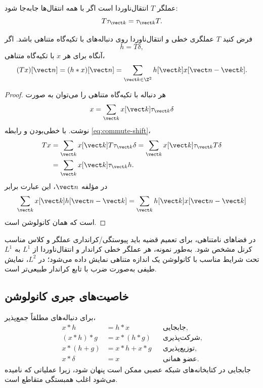 \begin{definition}
عملگر \(T\) انتقال‌ناوردا است اگر با همه انتقال‌ها جابه‌جا شود:
\begin{equation}
T\tau_{\vect k}=\tau_{\vect k}T.
\label{eq:commute-shift}
\end{equation}
\end{definition}

\begin{theorem}
فرض کنید \(T\) عملگری خطی و انتقال‌ناوردا روی دنباله‌های با تکیه‌گاه متناهی باشد. اگر
\begin{equation}
h=T\delta,
\end{equation}
آنگاه برای هر \(x\) با تکیه‌گاه متناهی،
\begin{equation}
(Tx)[\vect n]=(h*x)[\vect n]
=\sum_{\vect k\in\Z^2}h[\vect k]x[\vect n-\vect k].
\label{eq:lti-convolution}
\end{equation}
\end{theorem}

\begin{proof}
هر دنباله با تکیه‌گاه متناهی را می‌توان به صورت
\begin{equation}
x=\sum_{\vect k}x[\vect k]\tau_{\vect k}\delta
\end{equation}
نوشت. با خطی‌بودن و رابطه \eqref{eq:commute-shift}،
\begin{align}
Tx
&=\sum_{\vect k}x[\vect k]T\tau_{\vect k}\delta
=\sum_{\vect k}x[\vect k]\tau_{\vect k}T\delta\\
&=\sum_{\vect k}x[\vect k]\tau_{\vect k}h.
\end{align}
در مؤلفه \(\vect n\)، این عبارت برابر
\begin{equation}
\sum_{\vect k}x[\vect k]h[\vect n-\vect k]
=\sum_{\vect k}h[\vect k]x[\vect n-\vect k]
\end{equation}
است که همان کانولوشن است.
\end{proof}

\begin{remark}
در فضاهای نامتناهی، برای تعمیم قضیه باید پیوستگی/کرانداری عملگر و کلاس مناسب کرنل مشخص شود.
به‌طور نمونه، هر عملگر خطی کراندار و انتقال‌ناوردا از \(L^1\) به \(L^1\) تحت شرایط مناسب با کانولوشن
یک اندازه متناهی نمایش داده می‌شود؛ در \(L^2\)، نمایش طیفی به‌صورت ضرب با تابع کراندار طبیعی‌تر است.
\end{remark}

\subsection{خاصیت‌های جبری کانولوشن}
برای دنباله‌های مطلقاً جمع‌پذیر،
\begin{align}
x*h&=h*x &&\text{جابجایی},\\
(x*h)*g&=x*(h*g) &&\text{شرکت‌پذیری},\\
x*(h+g)&=x*h+x*g &&\text{توزیع‌پذیری},\\
x*\delta&=x &&\text{عضو همانی}.
\end{align}
جابجایی در کتابخانه‌های شبکه عصبی ممکن است پنهان شود، زیرا عملیاتی که  نامیده می‌شود
اغلب همبستگی متقاطع است.

